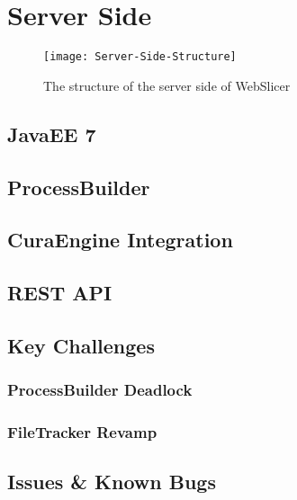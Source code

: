 \chapter{Server Side}
\begin{figure}[!ht]
  \centering
  \texttt{[image: Server-Side-Structure]}
  \caption{The structure of the server side of WebSlicer}
  \label{fig:server-side-structure}
\end{figure}

\section{JavaEE 7}
% 
\section{ProcessBuilder}
\section{CuraEngine Integration}
\section{REST API}

\section{Key Challenges}
\subsection{ProcessBuilder Deadlock}
\paragraph{}

\subsection{FileTracker Revamp}
\paragraph{}

\section{Issues \& Known Bugs}


